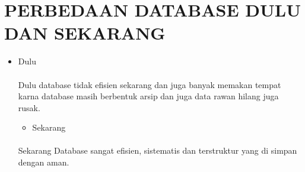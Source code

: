 \documentclass[a4paper,12pt]{article}
\begin{document}
\section{PERBEDAAN DATABASE DULU DAN SEKARANG}
\begin{itemize}
\item Dulu
\paragraph{}
Dulu database tidak efisien sekarang dan juga banyak memakan tempat karna database masih berbentuk arsip dan juga data rawan hilang juga rusak.
\begin{itemize}
\item Sekarang
\end{itemize}
\paragraph{}
Sekarang Database sangat efisien, sistematis dan terstruktur yang di simpan dengan aman.
\end{itemize}
\end{document}
